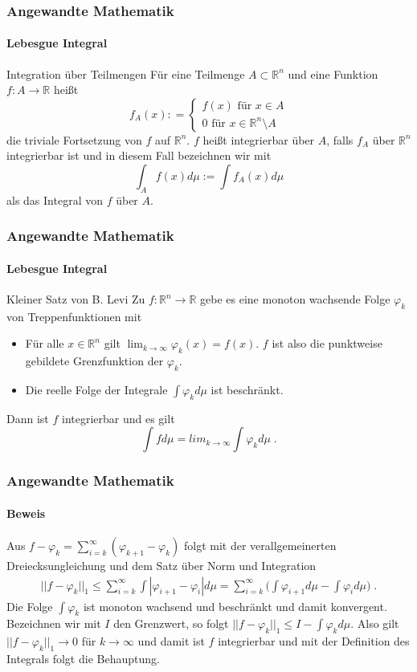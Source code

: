 \documentclass{beamer}
\begin{document}
\begin{frame}
    \frametitle{Angewandte Mathematik}
\framesubtitle{Lebesgue Integral}
    \begin{block}{Integration über Teilmengen}
Für  eine Teilmenge $A \subset \mathbb{R}^n$ und eine Funktion $f: A \to \mathbb{R}$ heißt
$$  f_A (x) : = \begin{cases}  f(x) \text{ für } x \in A \\ 0  \text{ für } x \in \mathbb{R}^n \setminus A \end{cases}$$ 
die triviale Fortsetzung von $f$ auf $\mathbb{R}^n$. $f$ heißt integrierbar über $A$, falls $f_A$ über $\mathbb{R}^n$ integrierbar ist und in diesem Fall bezeichnen wir mit $$ \int_A f(x) d \mu := \int f_A (x) d\mu$$ als das Integral von $f$ über $A$.
\end{block}

 \end{frame}



\begin{frame}
    \frametitle{Angewandte Mathematik}
\framesubtitle{Lebesgue Integral}
    \begin{block}{Kleiner Satz von B. Levi}
Zu $f: \mathbb{R}^n \to \mathbb{R}$ gebe es eine monoton wachsende Folge $\varphi_k$ von Treppenfunktionen mit
\begin{itemize}
\item Für alle $x \in \mathbb{R}^n$ gilt $\lim_{k \to \infty} \varphi_k(x) =  f(x)$. $f$ ist also die punktweise gebildete Grenzfunktion der $\varphi_k$.
\item Die reelle Folge der Integrale $\int \varphi_k d \mu $ ist beschränkt.
\end{itemize}
Dann ist $f$ integrierbar und es gilt $$ \int f d \mu = lim_{k \to \infty}  \int \varphi_k d \mu \; .$$
\end{block}

 \end{frame}




\begin{frame}
    \frametitle{Angewandte Mathematik}
\framesubtitle{Beweis}
Aus $f  - \varphi_k = \sum_{i=k}^{\infty} (\varphi_{k+1} - \varphi_k)$ folgt mit der verallgemeinerten Dreiecksungleichung  und dem Satz über Norm und Integration 
\begin{align*}
|| f - \varphi_k ||_1 \leq \sum_{i=k}^{\infty} \int | \varphi_{i+1} - \varphi_i | d \mu =  \sum_{i=k}^{\infty} \biggl ( \int  \varphi_{i+1}d \mu -  \int \varphi_i  d \mu \biggr ) \; .
\end{align*}
Die Folge $\int \varphi_k$ ist monoton wachsend und beschränkt und damit konvergent. Bezeichnen wir mit $I$ den Grenzwert, so folgt 
$|| f -\varphi_k ||_1 \leq I - \int \varphi_k d \mu $. Also gilt $|| f -\varphi_k ||_1 \to 0$ für $k \to \infty$ und damit ist $f$ integrierbar und mit der Definition des Integrals folgt die Behauptung.
 \end{frame}
\end{document}
